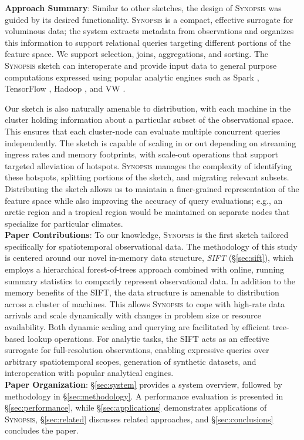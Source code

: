 \documentclass[9pt,journal,compsoc]{IEEEtran}
\begin{document}
%
\vspace{0.7em}
%
\textbf{Approach Summary}:
Similar to other sketches, the design of \textsc{Synopsis} was guided by its desired functionality. \textsc{Synopsis} is a compact, effective surrogate for voluminous data; the system extracts metadata from observations and organizes this information to support relational queries targeting different portions of the feature space. We support selection, joins, aggregations, and sorting. The \textsc{Synopsis} sketch can interoperate and provide input data to general purpose computations expressed using popular analytic engines such as Spark \cite{zaharia2010spark,armbrust2015spark}, TensorFlow \cite{abadi2016tensorflow,tensorflow}, Hadoop \cite{hadoop,shvachko2010hadoop,borthakur2008hdfs}, and VW \cite{langford2007vowpal}.

Our sketch is also naturally amenable to distribution, with each machine in the cluster holding information about a particular subset of the observational space.  This ensures that each cluster-node can evaluate multiple concurrent queries independently. The sketch is capable of scaling in or out depending on streaming ingress rates and memory footprints, with scale-out operations that support targeted alleviation of hotspots. \textsc{Synopsis} manages the complexity of identifying these hotspots, splitting portions of the sketch, and migrating relevant subsets. Distributing the sketch allows us to maintain a finer-grained representation of the feature space while also improving the accuracy of query evaluations; e.g., an arctic region and a tropical region would be maintained on separate nodes that specialize for particular climates.
%
\vspace{0.7em}\\
%
\textbf{Paper Contributions}:
To our knowledge, \textsc{Synopsis} is the first sketch tailored specifically for spatiotemporal observational data. The methodology of this study is centered around our novel in-memory data structure, \emph{SIFT} (\S\ref{sec:sift}), which employs a hierarchical forest-of-trees approach combined with online, running summary statistics to compactly represent observational data. In addition to the memory benefits of the SIFT, the data structure is amenable to distribution across a cluster of machines. This allows \textsc{Synopsis} to cope with high-rate data arrivals and scale dynamically with changes in problem size or resource availability. Both dynamic scaling and querying are facilitated by efficient tree-based lookup operations. For analytic tasks, the SIFT acts as an effective surrogate for full-resolution observations, enabling expressive queries over arbitrary spatiotemporal scopes, generation of synthetic datasets, and interoperation with popular analytical engines.
%
\vspace{0.7em}\\
%
\textbf{Paper Organization}:
\S\ref{sec:system} provides a system overview, followed by methodology in \S\ref{sec:methodology}. A performance evaluation is presented in \S\ref{sec:performance}, while \S\ref{sec:applications} demonstrates applications of \textsc{Synopsis}, \S\ref{sec:related} discusses related approaches, and \S\ref{sec:conclusions} concludes the paper.
\vspace{-0.7em}
%
%
\end{document}
